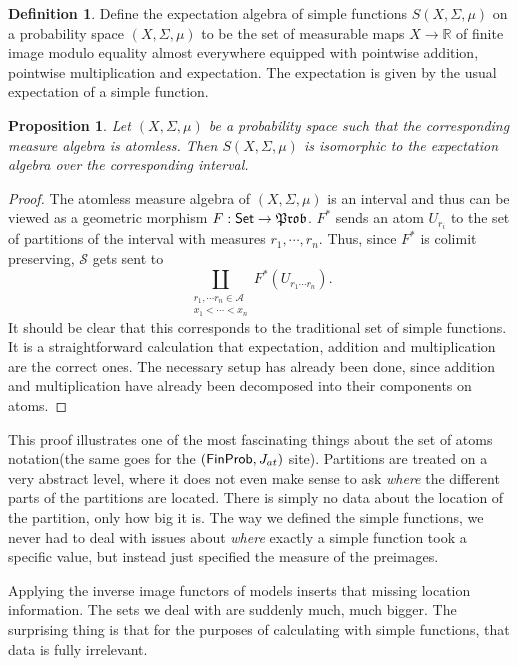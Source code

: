 \documentclass[a4paper]{amsproc}
\theoremstyle{plain}
\newtheorem{proposition}[theorem]{Proposition}
\theoremstyle{definition}
\newtheorem{definition}[theorem]{Definition}
\theoremstyle{remark}
\numberwithin{equation}{section}
\newcommand{\Set}{\textup{\textsf{Set}}}
\newcommand{\FinProb}{\textup{\textsf{FinProb}}}
\newcommand{\Prob}{\mathfrak{Prob}}
\begin{document}
\begin{definition}
    Define the expectation algebra of simple functions $S(X,\Sigma, \mu)$ on a probability space $(X, \Sigma, \mu)$ to be the set of measurable maps $X \to \mathbb{R}$ of finite image modulo equality almost everywhere equipped with pointwise addition, pointwise multiplication and expectation. The expectation is given by the usual expectation of a simple function.
\end{definition}

\begin{proposition}
    Let $(X, \Sigma, \mu)$ be a probability space such that the corresponding measure algebra is atomless. Then $S(X,\Sigma,\mu)$ is isomorphic to the expectation algebra over the corresponding interval.
\end{proposition}
\begin{proof}
    The atomless measure algebra of $(X, \Sigma, \mu)$ is an interval and thus can be viewed as a geometric morphism $F: \Set \to \Prob$. $F^*$ sends an atom $U_{r_i}$ to the set of partitions of the interval with measures $r_1,\cdots,r_n$. Thus, since $F^*$ is colimit preserving, $\mathcal{S}$ gets sent to
    \[
        \coprod_{\substack{r_1, \cdots r_n \in \mathcal{A} \\ x_1 < \cdots < x_n}} F^*(U_{r_1\cdots r_n}) .
    \]
    It should be clear that this corresponds to the traditional set of simple functions. It is a straightforward calculation that expectation, addition and multiplication are the correct ones. The necessary setup has already been done, since addition and multiplication have already been decomposed into their components on atoms.
\end{proof}

This proof illustrates one of the most fascinating things about the set of atoms notation(the same goes for the $(\FinProb, J_{at})$ site). Partitions are treated on a very abstract level, where it does not even make sense to ask \emph{where} the different parts of the partitions are located. There is simply no data about the location of the partition, only how big it is. The way we defined the simple functions, we never had to deal with issues about \emph{where} exactly a simple function took a specific value, but instead just specified the measure of the preimages.

Applying the inverse image functors of models inserts that missing location information. The sets we deal with are suddenly much, much bigger. The surprising thing is that for the purposes of calculating with simple functions, that data is fully irrelevant.
\end{document}
